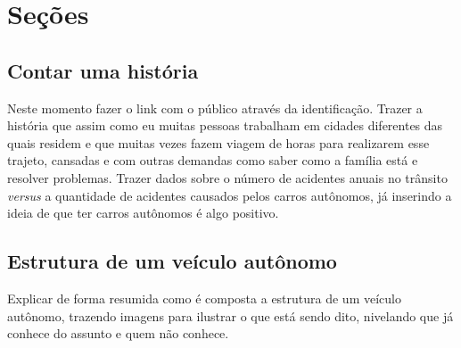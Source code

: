 \documentclass[12pt,a4paper]{article}
\begin{document}
    \section{Seções}


    \subsection{Contar uma história}
    \par Neste momento fazer o link com o público através da identificação. Trazer a história que assim como eu muitas pessoas trabalham em cidades diferentes das quais residem e que muitas vezes fazem viagem de horas para realizarem esse trajeto, cansadas e com outras demandas como saber como a família está e resolver problemas. Trazer dados sobre o número de acidentes anuais no trânsito \textit{versus} a quantidade de acidentes causados pelos carros autônomos, já inserindo a ideia de que ter carros autônomos é algo positivo.



    \subsection{Estrutura de um veículo autônomo}
    \par Explicar de forma resumida como é composta a estrutura de um veículo autônomo, trazendo imagens para ilustrar o que está sendo dito, nivelando que já conhece do assunto e quem não conhece. 
\end{document}
